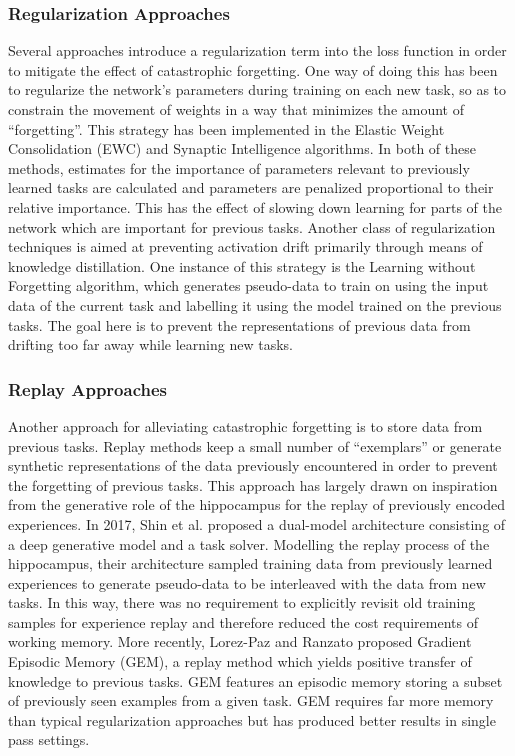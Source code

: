 \documentclass{article}
\begin{document}
\subsubsection{Regularization Approaches}
Several approaches introduce a regularization term into the loss function in order to mitigate the effect of catastrophic forgetting. One way of doing this has been to regularize the network’s parameters during training on each new task, so as to constrain the movement of weights in a way that minimizes the amount of “forgetting”. This strategy has been implemented in the Elastic Weight Consolidation (EWC) \cite{kirkpatrick2017overcoming} and Synaptic Intelligence \cite{zenke2017continual} algorithms.  In both of these methods, estimates for the importance of parameters relevant to previously learned tasks are calculated and parameters are penalized proportional to their relative importance. This has the effect of slowing down learning for parts of the network which are important for previous tasks. Another class of regularization techniques is aimed at preventing activation drift primarily through means of knowledge distillation. One instance of this strategy is the Learning without Forgetting \cite{li2017learning} algorithm, which generates pseudo-data to train on using the input data of the current task and labelling it using the model trained on the previous tasks. The goal here is to prevent the representations of previous data from drifting too far away while learning new tasks.

\subsubsection{Replay Approaches} \label{replay_approaches}
Another approach for alleviating catastrophic forgetting is to store data from previous tasks. Replay methods keep a small number of “exemplars” or generate synthetic representations of the data previously encountered in order to prevent the forgetting of previous tasks. This approach has largely drawn on inspiration from the generative role of the hippocampus for the replay of previously encoded experiences. In 2017, Shin et al. \cite{shin2017continual} proposed a dual-model architecture consisting of a deep generative model and a task solver. Modelling the replay process of the hippocampus, their architecture sampled training data from previously learned experiences to generate pseudo-data to be interleaved with the data from new tasks. In this way, there was no requirement to explicitly revisit old training samples for experience replay and therefore reduced the cost requirements of working memory. More recently, Lorez-Paz and Ranzato \cite{lopez2017gradient} proposed Gradient Episodic Memory (GEM), a replay method which yields positive transfer of knowledge to previous tasks. GEM features an episodic memory storing a subset of previously seen examples from a given task. GEM requires far more memory than typical regularization approaches but has produced better results in single pass settings.
\end{document}
